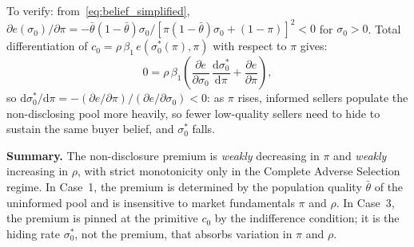 To verify: from~\eqref{eq:belief_simplified}, $\partial e(\sigma_0)/\partial\pi = -\bar{\theta}(1-\bar{\theta})\sigma_0/[\pi(1-\bar{\theta})\sigma_0+(1-\pi)]^2 < 0$ for $\sigma_0>0$. Total differentiation of $c_0=\rho\,\beta_1\,e(\sigma_0^*(\pi),\pi)$ with respect to $\pi$ gives:
\begin{equation}
    0 = \rho\,\beta_1\left(\frac{\partial e}{\partial\sigma_0}\,\frac{\mathrm{d}\sigma_0^*}{\mathrm{d}\pi} + \frac{\partial e}{\partial\pi}\right),
\end{equation}
so $\mathrm{d}\sigma_0^*/\mathrm{d}\pi = -(\partial e/\partial\pi)/(\partial e/\partial\sigma_0) < 0$: as $\pi$ rises, informed sellers populate the non-disclosing pool more heavily, so fewer low-quality sellers need to hide to sustain the same buyer belief, and $\sigma_0^*$ falls.

\medskip
\textbf{Summary.} The non-disclosure premium is \emph{weakly} decreasing in $\pi$ and \emph{weakly} increasing in $\rho$, with strict monotonicity only in the Complete Adverse Selection regime. In Case~1, the premium is determined by the population quality $\bar{\theta}$ of the uninformed pool and is insensitive to market fundamentals $\pi$ and $\rho$. In Case~3, the premium is pinned at the primitive $c_0$ by the indifference condition; it is the hiding rate $\sigma_0^*$, not the premium, that absorbs variation in $\pi$ and $\rho$.

